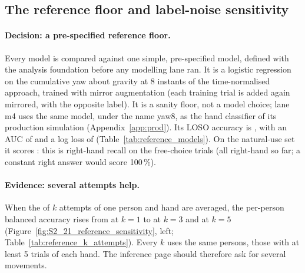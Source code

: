 \subsection{The reference floor and label-noise sensitivity}\label{app:data:reference}

\paragraph{Decision: a pre-specified reference floor.} Every model is compared against one simple,
pre-specified model, defined with the analysis foundation before any modelling lane ran. It is a logistic regression on the cumulative yaw about gravity
at 8 instants of the time-normalised approach, trained with mirror augmentation (each training trial is added
again mirrored, with the opposite label). It is a sanity floor, not a model choice; lane m4 uses the same model,
under the name yaw8, as the hand classifier of its production simulation (Appendix~\ref{app:prod}). Its LOSO accuracy is
, with an AUC of  and a log loss of 
(Table~\ref{tab:reference_models}). On the natural-use set it scores : this is
right-hand recall on the free-choice trials (all right-hand so far; a constant right answer would score
100\,\%).

\paragraph{Evidence: several attempts help.} When the \pright{} of $k$ attempts of one person and hand are
averaged, the per-person balanced accuracy rises from  at $k = 1$ to  at
$k = 3$ and  at $k = 5$ (Figure~\ref{fig:S2_21_reference_sensitivity}, left;
Table~\ref{tab:reference_k_attempts}). Every $k$ uses the same  persons, those with at
least 5 trials of each hand. The inference page should therefore ask for several movements.

